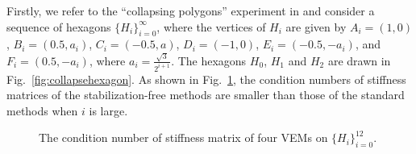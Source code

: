 \documentclass[10pt]{amsart}
\theoremstyle{definition}
\theoremstyle{remark}
\begin{document}
\begin{enumerate}[1.]
Firstly, we refer to the ``collapsing polygons'' experiment in
\cite{Mascotto2018} and consider a sequence of hexagons
$\{H_i\}_{i=0}^{\infty}$, where the vertices of $H_i$ are given by
$A_i = (1, 0)$, $B_i = (0.5, a_i)$, $C_i = (-0.5, a)$, $D_i=(-1, 0)$, 
$E_i = (-0.5, -a_i)$, and $F_i = (0.5, -a_i)$,
where $a_i = \frac{\sqrt{3}}{2^{i+1}}$. The hexagons $H_0$, $H_1$ and $H_2$ are drawn
in Fig.~\ref{fig:collapsehexagon}. 
As shown in Fig.~\ref{fig:collapsehexagon_conditionnumber}, the condition numbers of stiffness
matrices of the stabilization-free methods are smaller than those of the standard methods when $i$ is large.

\begin{figure}[htbp]
\quad \quad
{}
\caption{The condition number of stiffness matrix of four VEMs on
$\{H_i\}_{i=0}^{12}$.}
\label{fig:collapsehexagon_conditionnumber}
\end{figure}



\end{enumerate}
\end{document}
